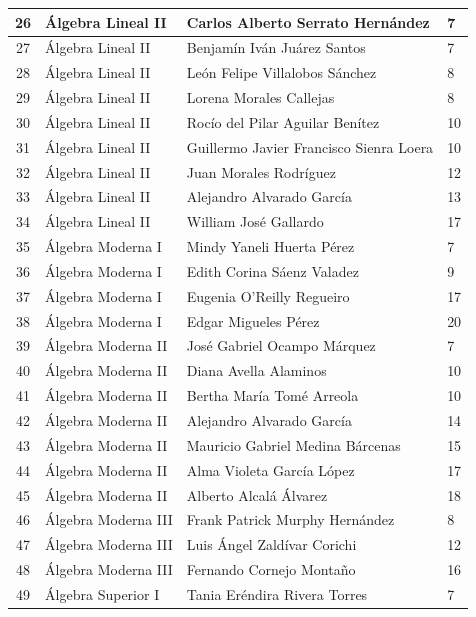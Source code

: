 {\begin{longtable}{|c|p{6.5cm}|p{5cm}|p{1.5cm}|}
26 & Álgebra Lineal II & Carlos Alberto Serrato Hernández & 7 \\ \hline
27 & Álgebra Lineal II & Benjamín Iván Juárez Santos & 7 \\ \hline
28 & Álgebra Lineal II & León Felipe Villalobos Sánchez & 8 \\ \hline
29 & Álgebra Lineal II & Lorena Morales Callejas & 8 \\ \hline
30 & Álgebra Lineal II & Rocío del Pilar Aguilar Benítez & 10 \\ \hline
31 & Álgebra Lineal II & Guillermo Javier Francisco Sienra Loera & 10 \\ \hline
32 & Álgebra Lineal II & Juan Morales Rodríguez & 12 \\ \hline
33 & Álgebra Lineal II & Alejandro Alvarado García & 13 \\ \hline
34 & Álgebra Lineal II & William José Gallardo & 17 \\ \hline
35 & Álgebra Moderna I & Mindy Yaneli Huerta Pérez & 7 \\ \hline
36 & Álgebra Moderna I & Edith Corina Sáenz Valadez & 9 \\ \hline
37 & Álgebra Moderna I & Eugenia O'Reilly Regueiro & 17 \\ \hline
  38 & Álgebra Moderna I & Edgar Migueles Pérez & 20 \\ \hline
  39 & Álgebra Moderna II & José Gabriel Ocampo Márquez & 7 \\ \hline
  40 & Álgebra Moderna II & Diana Avella Alaminos & 10 \\ \hline
  41 & Álgebra Moderna II & Bertha María Tomé Arreola & 10 \\ \hline
  42 & Álgebra Moderna II & Alejandro Alvarado García & 14 \\ \hline
  43 & Álgebra Moderna II & Mauricio Gabriel Medina Bárcenas & 15 \\ \hline
  44 & Álgebra Moderna II & Alma Violeta García López & 17 \\ \hline
  45 & Álgebra Moderna II & Alberto Alcalá Álvarez & 18 \\ \hline
  46 & Álgebra Moderna III & Frank Patrick Murphy Hernández & 8 \\ \hline
  47 & Álgebra Moderna III & Luis Ángel Zaldívar Corichi & 12 \\ \hline
  48 & Álgebra Moderna III & Fernando Cornejo Montaño & 16 \\ \hline
  49 & Álgebra Superior I & Tania Eréndira Rivera Torres & 7 \\ \hline

\end{longtable}}

